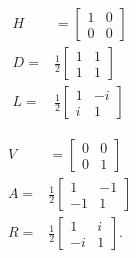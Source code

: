 	\begin{minipage}{0.5\textwidth}
	\vspace{0pt}
	\begin{align*}
		{H} &= \begin{bmatrix}1&0\\0&0\end{bmatrix} \\
		{D} =& \frac{1}{{2}}\begin{bmatrix}1&1\\1&1\end{bmatrix}\\
		{L} =& \frac{1}{{2}}\begin{bmatrix}1&-i\\i&1\end{bmatrix}
	\end{align*}
	\end{minipage}
	\begin{minipage}{0.5\textwidth}
	\vspace{0pt}
	\begin{align*}
		{V} &= \begin{bmatrix}0&0\\0&1\end{bmatrix}\\
		{A} =& \frac{1}{{2}}\begin{bmatrix}1&-1\\-1&1\end{bmatrix}\\
		{R} =& \frac{1}{{2}}\begin{bmatrix}1&i\\-i&1\end{bmatrix}.
	\end{align*}
	\end{minipage}

